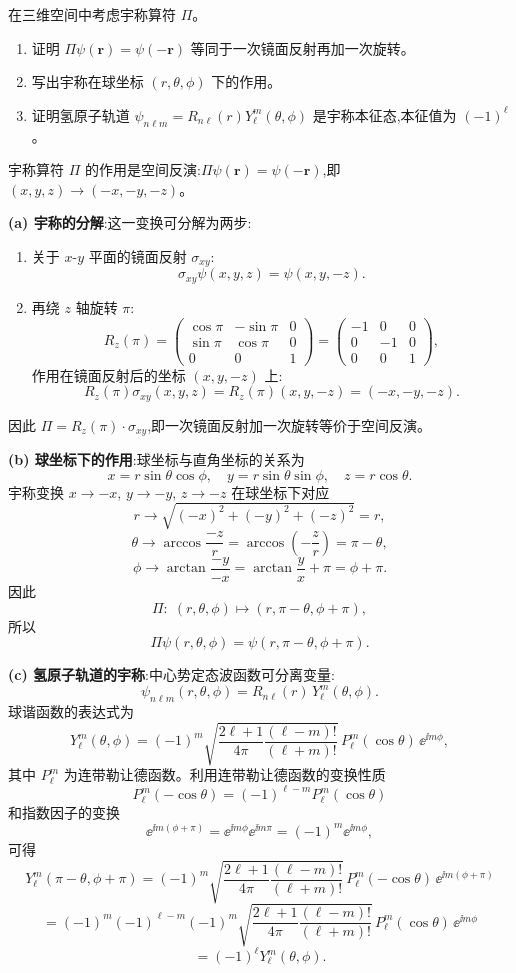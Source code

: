 \begin{question}
在三维空间中考虑宇称算符 $\Pi$。
\begin{enumerate}
\item 证明 $\Pi\psi(\mathbf r)=\psi(-\mathbf r)$ 等同于一次镜面反射再加一次旋转。
\item 写出宇称在球坐标 $(r,\theta,\phi)$ 下的作用。
\item 证明氢原子轨道 $\psi_{n\ell m}=R_{n\ell}(r)Y_\ell^m(\theta,\phi)$ 是宇称本征态,本征值为 $(-1)^\ell$。
\end{enumerate}
\begin{solution}
	宇称算符 $\Pi$ 的作用是空间反演:$\Pi\psi(\mathbf r)=\psi(-\mathbf r)$,即 $(x,y,z)\to(-x,-y,-z)$。

	\textbf{(a) 宇称的分解}:这一变换可分解为两步:
	\begin{enumerate}
	\item 关于 $x$-$y$ 平面的镜面反射 $\sigma_{xy}$:
	\[
	\sigma_{xy}\psi(x,y,z)=\psi(x,y,-z).
	\]
	\item 再绕 $z$ 轴旋转 $\pi$:
	\[
	R_z(\pi)=\begin{pmatrix}\cos\pi&-\sin\pi&0\\\sin\pi&\cos\pi&0\\0&0&1\end{pmatrix}
	=\begin{pmatrix}-1&0&0\\0&-1&0\\0&0&1\end{pmatrix},
	\]
	作用在镜面反射后的坐标 $(x,y,-z)$ 上:
	\[
	R_z(\pi)\sigma_{xy}(x,y,z)=R_z(\pi)(x,y,-z)=(-x,-y,-z).
	\]
	\end{enumerate}
	因此 $\Pi = R_z(\pi) \cdot \sigma_{xy}$,即一次镜面反射加一次旋转等价于空间反演。

	\textbf{(b) 球坐标下的作用}:球坐标与直角坐标的关系为
	\[
	x = r\sin\theta\cos\phi,\quad y = r\sin\theta\sin\phi,\quad z = r\cos\theta.
	\]
	宇称变换 $x\to -x,\,y\to -y,\,z\to -z$ 在球坐标下对应
	\[
	r\to\sqrt{(-x)^2+(-y)^2+(-z)^2}=r,
	\]
	\[
	\theta\to\arccos\frac{-z}{r}=\arccos\!\left(-\frac{z}{r}\right)=\pi-\theta,
	\]
	\[
	\phi\to\arctan\frac{-y}{-x}=\arctan\frac{y}{x}+\pi=\phi+\pi.
	\]
	因此
	\[
	\Pi:\;(r,\theta,\phi)\longmapsto (r,\pi-\theta,\phi+\pi),
	\]
	所以
	\[
	\Pi\psi(r,\theta,\phi)=\psi(r,\pi-\theta,\phi+\pi).
	\]

	\textbf{(c) 氢原子轨道的宇称}:中心势定态波函数可分离变量:
	\[
	\psi_{n\ell m}(r,\theta,\phi)=R_{n\ell}(r)\,Y_\ell^m(\theta,\phi).
	\]
	球谐函数的表达式为
	\[
	Y_\ell^m(\theta,\phi)=(-1)^m\sqrt{\frac{2\ell+1}{4\pi}\frac{(\ell-m)!}{(\ell+m)!}}\,P_\ell^m(\cos\theta)\,\ee^{\ii m\phi},
	\]
	其中 $P_\ell^m$ 为连带勒让德函数。利用连带勒让德函数的变换性质
	\[
	P_\ell^m(-\cos\theta)=(-1)^{\ell-m}P_\ell^m(\cos\theta)
	\]
	和指数因子的变换
	\[
	\ee^{\ii m(\phi+\pi)}=\ee^{\ii m\phi}\ee^{\ii m\pi}=(-1)^m \ee^{\ii m\phi},
	\]
	可得
	\[
	Y_\ell^m(\pi-\theta,\phi+\pi)=(-1)^m\sqrt{\frac{2\ell+1}{4\pi}\frac{(\ell-m)!}{(\ell+m)!}}\,P_\ell^m(-\cos\theta)\,\ee^{\ii m(\phi+\pi)}
	\]
	\[
	=(-1)^m(-1)^{\ell-m}(-1)^m\sqrt{\frac{2\ell+1}{4\pi}\frac{(\ell-m)!}{(\ell+m)!}}\,P_\ell^m(\cos\theta)\,\ee^{\ii m\phi}
	\]
	\[
	=(-1)^\ell Y_\ell^m(\theta,\phi).
	\]


\end{solution}
\end{question}
